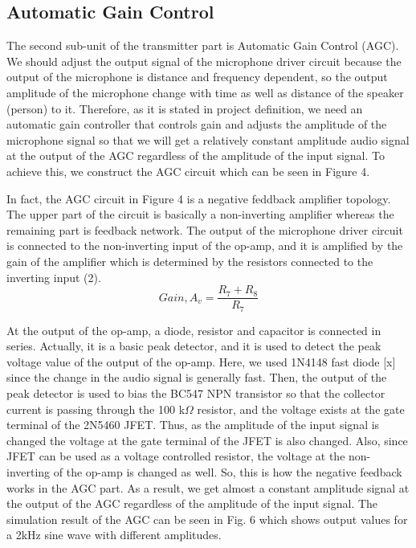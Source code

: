 \documentclass[conference]{IEEEtran}
\begin{document}
\subsection{Automatic Gain Control}
The second sub-unit of the transmitter part is Automatic Gain Control (AGC). We should adjust the output signal of the microphone driver circuit because the output of the microphone is distance and frequency dependent, so the output amplitude of the microphone change with time as well as distance of the speaker (person) to it. Therefore, as it is stated in project definition, we need an automatic gain controller that controls gain and adjusts the amplitude of the microphone signal so that we will get a relatively constant amplitude audio signal at the output of the AGC regardless of the amplitude of the input signal. To achieve this, we construct the AGC circuit which can be seen in Figure 4. \\
\par In fact, the AGC circuit in Figure 4 is a negative feddback amplifier topology. The upper part of the circuit is basically a non-inverting amplifier whereas the remaining part is feedback network. The output of the microphone driver circuit is connected to the non-inverting input of the op-amp, and it is amplified by the gain of the amplifier which is determined by the resistors connected to the inverting input (2). 
\begin{equation}\label{eq:2}
        Gain, A_v = \frac{R_7+R_8}{R_7} 
 \end{equation}
\par At the output of the op-amp, a diode, resistor and capacitor is connected in series. Actually, it is a basic peak detector, and it is used to detect the peak voltage value of the output of the op-amp. Here, we used 1N4148 fast diode [x] since the change in the audio signal is generally fast. Then, the output of the peak detector is used to bias the BC547 NPN transistor so that the collector current is passing through the 100 k\(\Omega\) resistor, and the voltage exists at the gate terminal of the 2N5460 JFET. Thus, as the amplitude of the input signal is changed the voltage at the gate terminal of the JFET is also changed. Also, since JFET can be used as a voltage controlled resistor, the voltage at the non-inverting of the op-amp is changed as well. So, this is how the negative feedback works in the AGC part. As a result, we get almost a constant amplitude signal at the output of the AGC regardless of the amplitude of the input signal. The simulation result of the AGC can be seen in Fig. 6 which shows output values for a 2kHz sine wave with different amplitudes.
\end{document}
